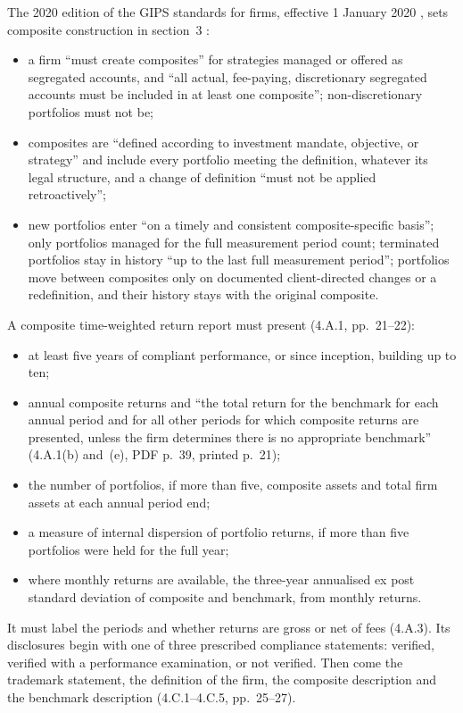 \begin{qfmethod}\label{meth:gips-composite-presentation}
 The 2020 edition of the GIPS standards for firms, effective 1 January 2020 \citep[Introduction, PDF p.~17]{wide-gips-2020}, sets composite construction in section~3 \citep[provisions 3.A.1--3.A.11, pp.~18--19]{wide-gips-2020}:
\begin{itemize}
\item a firm ``must create composites'' for strategies managed or offered as segregated accounts, and ``all actual, fee-paying, discretionary segregated accounts must be included in at least one composite''; non-discretionary portfolios must not be;
\item composites are ``defined according to investment mandate, objective, or strategy'' and include every portfolio meeting the definition, whatever its legal structure, and a change of definition ``must not be applied retroactively'';
\item new portfolios enter ``on a timely and consistent composite-specific basis''; only portfolios managed for the full measurement period count; terminated portfolios stay in history ``up to the last full measurement period''; portfolios move between composites only on documented client-directed changes or a redefinition, and their history stays with the original composite.
\end{itemize}
A composite time-weighted return report must present (4.A.1, pp.~21--22):
\begin{itemize}
\item at least five years of compliant performance, or since inception, building up to ten;
\item annual composite returns and ``the total return for the benchmark for each annual period and for all other periods for which composite returns are presented, unless the firm determines there is no appropriate benchmark'' (4.A.1(b) and~(e), PDF p.~39, printed p.~21);
\item the number of portfolios, if more than five, composite assets and total firm assets at each annual period end;
\item a measure of internal dispersion of portfolio returns, if more than five portfolios were held for the full year;
\item where monthly returns are available, the three-year annualised ex post standard deviation of composite and benchmark, from monthly returns.
\end{itemize}
It must label the periods and whether returns are gross or net of fees (4.A.3). Its disclosures begin with one of three prescribed compliance statements: verified, verified with a performance examination, or not verified. Then come the trademark statement, the definition of the firm, the composite description and the benchmark description (4.C.1--4.C.5, pp.~25--27).


\end{qfmethod}
